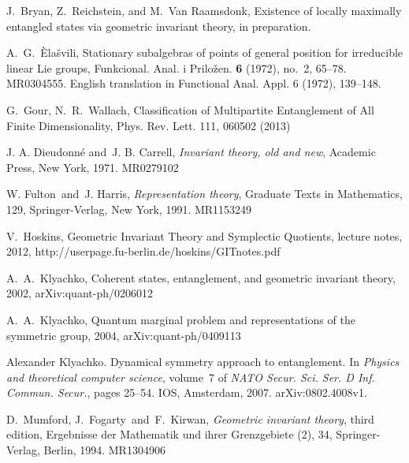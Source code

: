 \documentclass[12pt]{article}
\theoremstyle{definition}
\begin{document}

\begin{thebibliography}{AAAA}
% 

J.~Bryan,  Z.~Reichstein, and M.~Van Raamsdonk,
Existence of locally maximally entangled states via geometric invariant theory,
in preparation.


A.~G.~\`Ela\v svili,
Stationary subalgebras of points of general position
for irreducible linear Lie groups, Funkcional. Anal. i Prilo\v zen.
{\bf 6} (1972), no.~2, 65--78. MR0304555.
English translation in Functional Anal. Appl. 6 (1972), 139--148.


 G.~Gour, N.~R.~Wallach,
Classification of Multipartite Entanglement of All Finite Dimensionality,
Phys. Rev. Lett. 111, 060502 (2013)

J. A. Dieudonn\'e and\ J. B. Carrell, {\it Invariant theory, old and new}, Academic Press, New York, 1971. MR0279102

W. Fulton\ and\ J. Harris, {\it Representation theory}, Graduate Texts in Mathematics, 129, Springer-Verlag, New York, 1991. MR1153249

V.~Hoskins, Geometric Invariant Theory and Symplectic Quotients,
lecture notes, 2012,
\noindent
http://userpage.fu-berlin.de/hoskins/GITnotes.pdf

A.~A.~Klyachko,  Coherent states, entanglement, and geometric invariant theory,
2002, arXiv:quant-ph/0206012

A.~A.~Klyachko,  Quantum marginal problem and representations of
the symmetric group, 2004, arXiv:quant-ph/0409113

Alexander Klyachko.
\newblock Dynamical symmetry approach to entanglement.
\newblock In {\em Physics and theoretical computer science}, volume~7 of {\em
  NATO Secur. Sci. Ser. D Inf. Commun. Secur.}, pages 25--54. IOS, Amsterdam,
  2007.
\newblock arXiv:0802.4008v1.


D.~Mumford, J.~Fogarty\ and\ F.~Kirwan, {\it Geometric invariant theory},
third edition, Ergebnisse der Mathematik und ihrer Grenzgebiete (2), 34,
Springer-Verlag, Berlin, 1994. MR1304906


\end{thebibliography}
\end{document}
